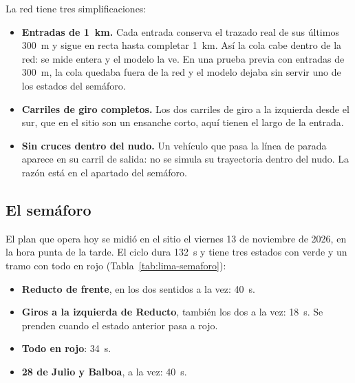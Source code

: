 La red tiene tres simplificaciones:
\begin{itemize}
  \item \textbf{Entradas de 1~km.} Cada entrada conserva el trazado real
    de sus últimos 300~m y sigue en recta hasta completar 1~km. Así la
    cola cabe dentro de la red: se mide entera y el modelo la ve. En una
    prueba previa con entradas de 300~m, la cola quedaba fuera de la red
    y el modelo dejaba sin servir uno de los estados del semáforo.
  \item \textbf{Carriles de giro completos.} Los dos carriles de giro a
    la izquierda desde el sur, que en el sitio son un ensanche corto,
    aquí tienen el largo de la entrada.
  \item \textbf{Sin cruces dentro del nudo.} Un vehículo que pasa la
    línea de parada aparece en su carril de salida: no se simula su
    trayectoria dentro del nudo. La razón está en el apartado del
    semáforo.
\end{itemize}

\subsection*{El semáforo}

El plan que opera hoy se midió en el sitio el viernes 13 de noviembre de
2026, en la hora punta de la tarde. El ciclo dura 132~s y tiene tres
estados con verde y un tramo con todo en rojo
(Tabla~\ref{tab:lima-semaforo}):
\begin{itemize}
  \item \textbf{Reducto de frente}, en los dos sentidos a la vez: 40~s.
  \item \textbf{Giros a la izquierda de Reducto}, también los dos a la
    vez: 18~s. Se prenden cuando el estado anterior pasa a rojo.
  \item \textbf{Todo en rojo}: 34~s.
  \item \textbf{28 de Julio y Balboa}, a la vez: 40~s.
\end{itemize}

\begin{table}[!tbp]
\centering
\footnotesize

\caption[Caso Lima: estados del semáforo]{Caso Lima: estados del semáforo del nudo, en su orden, con el verde del plan actual, el del fijo ajustado al segundo y el verde mínimo que puede dar cualquier control. Tras cada verde hay 3~s de ámbar y, tras los giros a la izquierda, 34~s con todo en rojo; esos tiempos son iguales en todos los controles.}
\label{tab:lima-semaforo}
\end{table}

